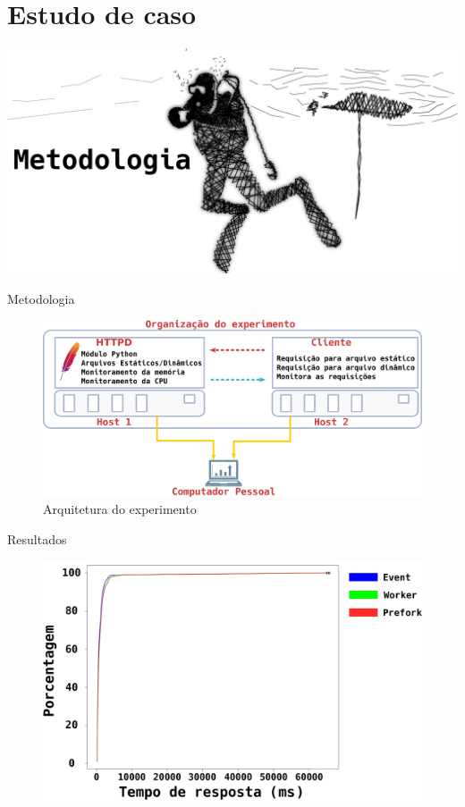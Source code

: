 \documentclass[xcolor={usenames,svgnames,dvipsnames},brazil,english,12pt,aspectratio=149]{beamer}
\begin{document}
\section{Estudo de caso}

\begin{frame}[plain]
  \centering
  \includegraphics[width=\textwidth]{presentation_cap4_sec1}
\end{frame}

\begin{frame}{Metodologia}
  \begin{figure}[!h] \centering
    \includegraphics[width=\textwidth]{experiment_arhitecture}
    \caption*{Arquitetura do experimento}
  \end{figure}
\end{frame}

\begin{frame}{Resultados}
  \begin{figure}[!h]
    \centering
    \includegraphics[width=.8\textwidth]{static_file}
  \end{figure}
\end{frame}
\end{document}
